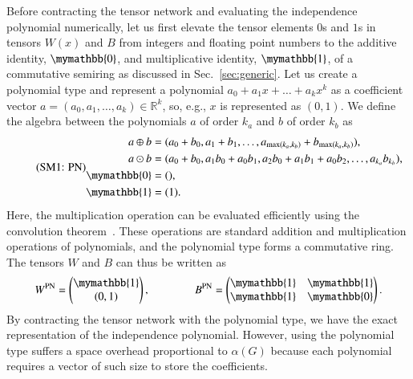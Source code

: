 \documentclass[onefignum, onetabnum]{siamart190516}
\newcommand{\eqname}[1]{\stepcounter{equation}\tag{\theequation : #1}}
\newcommand{\<}{\langle}
\renewcommand{\>}{\rangle}
\begin{document}
Before contracting the tensor network and evaluating the independence polynomial numerically, let us first elevate the tensor elements $0$s and $1$s in tensors $W(x)$ and $B$ from integers and floating point numbers to the additive identity,
$\mymathbb{0}$, and multiplicative identity, $\mymathbb{1}$, of a commutative semiring as discussed in Sec.~\ref{sec:generic}.
Let us create a polynomial type and represent a polynomial $a_0 + a_1 x + \ldots + a_k x^k$ as a coefficient vector $a = (a_0, a_1, \ldots, a_k) \in \mathbb{R}^k$, so, e.g., $x$ is represented as $(0, 1)$.
We define the algebra between the polynomials $a$ of order $k_a$ and $b$ of order $k_b$ as
\begin{equation}
    \eqname{PN}
    \begin{split}
    a \oplus b &= (a_0 + b_0, a_1 + b_1, \ldots, a_{\max(k_a, k_b)} + b_{\max(k_a, k_b)}),\\
    a \odot b &= (a_0 + b_0, a_1b_0 + a_0b_1, a_{2}b_{0} + a_{1}b_{1} + a_{0}b_{2},  \ldots, a_{k_a} b_{k_b}),\\
    \mymathbb{0} &= (),  \\
    \mymathbb{1} &= (1).\label{eq:polynomial}
    \end{split}
\end{equation}
Here, the multiplication operation can be evaluated efficiently using the convolution theorem~\cite{Schonhage1971}.
These operations are standard addition and multiplication operations of polynomials, and the polynomial type forms a commutative ring. The tensors $W$ and $B$ can thus be written as 
\begin{equation}
    W^{\rm PN} = \left(\begin{matrix}
        \mymathbb{1} \\
        (0,1)
    \end{matrix}\right),   
    \qquad \qquad
        B^{\rm PN} = \left(\begin{matrix}
        \mymathbb{1}  & \mymathbb{1} \\
        \mymathbb{1} & \mymathbb{0}
    \end{matrix}\right).
\end{equation}
By contracting the tensor network with the polynomial type, we have the exact representation of the independence polynomial.
However, using the polynomial type suffers a space overhead proportional to $\alpha(G)$ because each polynomial requires a vector of such size to store the coefficients. 
\end{document}
